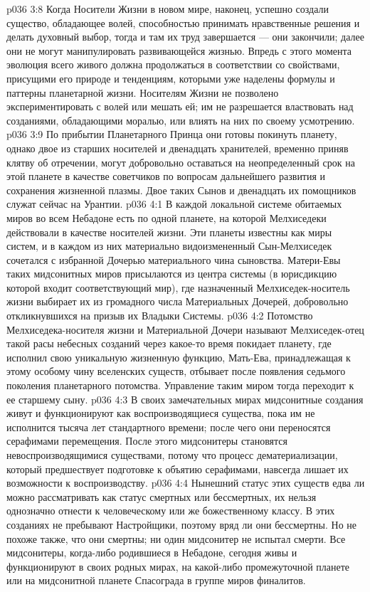 \vs p036 3:8 Когда Носители Жизни в новом мире, наконец, успешно создали существо, обладающее волей, способностью принимать нравственные решения и делать духовный выбор, тогда и там их труд завершается --- они закончили; далее они не могут манипулировать развивающейся жизнью. Впредь с этого момента эволюция всего живого должна продолжаться в соответствии со свойствами, присущими его природе и тенденциям, которыми уже наделены формулы и паттерны планетарной жизни. Носителям Жизни не позволено экспериментировать с волей или мешать ей; им не разрешается властвовать над созданиями, обладающими моралью, или влиять на них по своему усмотрению.
\vs p036 3:9 По прибытии Планетарного Принца они готовы покинуть планету, однако двое из старших носителей и двенадцать хранителей, временно приняв клятву об отречении, могут добровольно оставаться на неопределенный срок на этой планете в качестве советчиков по вопросам дальнейшего развития и сохранения жизненной плазмы. Двое таких Сынов и двенадцать их помощников служат сейчас на Урантии.
\vs p036 4:1 В каждой локальной системе обитаемых миров во всем Небадоне есть по одной планете, на которой Мелхиседеки действовали в качестве носителей жизни. Эти планеты известны как  миры систем, и в каждом из них материально видоизмененный Сын\hyp{}Мелхиседек сочетался с избранной Дочерью материального чина сыновства. Матери\hyp{}Евы таких мидсонитных миров присылаются из центра системы (в юрисдикцию которой входит соответствующий мир), где назначенный Мелхиседек\hyp{}носитель жизни выбирает их из громадного числа Материальных Дочерей, добровольно откликнувшихся на призыв их Владыки Системы.
\vs p036 4:2 Потомство Мелхиседека\hyp{}носителя жизни и Материальной Дочери называют  Мелхиседек\hyp{}отец такой расы небесных созданий через какое\hyp{}то время покидает планету, где исполнил свою уникальную жизненную функцию, Мать\hyp{}Ева, принадлежащая к этому особому чину вселенских существ, отбывает после появления седьмого поколения планетарного потомства. Управление таким миром тогда переходит к ее старшему сыну.
\vs p036 4:3 В своих замечательных мирах мидсонитные создания живут и функционируют как воспроизводящиеся существа, пока им не исполнится тысяча лет стандартного времени; после чего они переносятся серафимами перемещения. После этого мидсонитеры становятся невоспроизводящимися существами, потому что процесс дематериализации, который предшествует подготовке к объятию серафимами, навсегда лишает их возможности к воспроизводству.
\vs p036 4:4 Нынешний статус этих существ едва ли можно рассматривать как статус смертных или бессмертных, их нельзя однозначно отнести к человеческому или же божественному классу. В этих созданиях не пребывают Настройщики, поэтому вряд ли они бессмертны. Но не похоже также, что они смертны; ни один мидсонитер не испытал смерти. Все мидсонитеры, когда\hyp{}либо родившиеся в Небадоне, сегодня живы и функционируют в своих родных мирах, на какой\hyp{}либо промежуточной планете или на мидсонитной планете Спасограда в группе миров финалитов.
